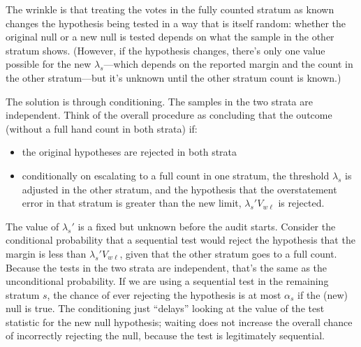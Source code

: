 The wrinkle is that treating the votes
in the fully counted stratum as known changes the hypothesis being tested in a way that is itself random:
whether the original null or a new null is tested depends on what the sample in the other stratum
shows.
(However, if the hypothesis changes, there's only one value possible for the new $\lambda_s$---which
depends on the reported margin and the count in the other stratum---but it's unknown 
until the other stratum count is known.)

The solution is through conditioning. The samples in the two strata are independent. 
Think of the overall procedure as concluding that the outcome (without a full
hand count in both strata) if:

\begin{itemize}
   \item the original hypotheses are rejected in both strata
   \item conditionally on escalating to a full count in one stratum, the threshold $\lambda_s$
            is adjusted in the other stratum, and the hypothesis that the overstatement error
            in that stratum is greater than the new limit, $\lambda_s' V_{w\ell}$ is rejected. 
\end{itemize}

The value of $\lambda_s'$ is a fixed but unknown before the audit starts.
Consider the conditional probability that a sequential test would reject the hypothesis that the margin is less than $\lambda_s' V_{w\ell}$, given that the other stratum goes to a full count. 
Because the tests in the two strata are independent, that's the same as the unconditional probability. 
If we are using a sequential test in the remaining stratum $s$, the chance of ever rejecting the 
hypothesis is at most $\alpha_s$ if the (new) null is true. 
The conditioning just ``delays'' looking at the value of the test statistic for the new null hypothesis; waiting does not increase the overall chance of incorrectly rejecting the null, 
because the test is legitimately sequential.